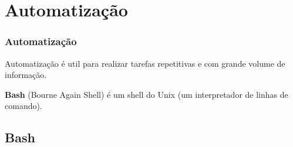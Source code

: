 \section{Automatização}
\begin{frame}
\frametitle{Automatização}
Automatização é util para realizar tarefas repetitivas e com grande volume de informação.

\vspace{3ex}
\textbf{Bash} (Bourne Again Shell) é um shell do Unix (um interpretador de linhas de comando).

\vspace{3ex}
\end{frame}


\subsection{Bash}
